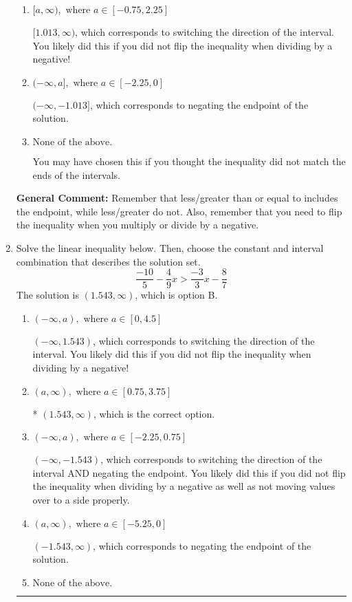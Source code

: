 \documentclass{extbook}[14pt]
\newcommand{\litem}[1]{\item #1

\rule{\textwidth}{0.4pt}}
\begin{document}
\begin{enumerate}
{\begin{enumerate}[label=\Alph*.]
* $(-\infty, 1.013]$, which is the correct option.
\item \( [a, \infty), \text{ where } a \in [-0.75, 2.25] \)

 $[1.013, \infty)$, which corresponds to switching the direction of the interval. You likely did this if you did not flip the inequality when dividing by a negative!
\item \( (-\infty, a], \text{ where } a \in [-2.25, 0] \)

 $(-\infty, -1.013]$, which corresponds to negating the endpoint of the solution.
\item \( \text{None of the above}. \)

You may have chosen this if you thought the inequality did not match the ends of the intervals.
\end{enumerate}

\textbf{General Comment:} Remember that less/greater than or equal to includes the endpoint, while less/greater do not. Also, remember that you need to flip the inequality when you multiply or divide by a negative.
}
\litem{
Solve the linear inequality below. Then, choose the constant and interval combination that describes the solution set.
\[ \frac{-10}{5} - \frac{4}{9} x > \frac{-3}{3} x - \frac{8}{7} \]The solution is \( (1.543, \infty) \), which is option B.\begin{enumerate}[label=\Alph*.]
\item \( (-\infty, a), \text{ where } a \in [0, 4.5] \)

 $(-\infty, 1.543)$, which corresponds to switching the direction of the interval. You likely did this if you did not flip the inequality when dividing by a negative!
\item \( (a, \infty), \text{ where } a \in [0.75, 3.75] \)

* $(1.543, \infty)$, which is the correct option.
\item \( (-\infty, a), \text{ where } a \in [-2.25, 0.75] \)

 $(-\infty, -1.543)$, which corresponds to switching the direction of the interval AND negating the endpoint. You likely did this if you did not flip the inequality when dividing by a negative as well as not moving values over to a side properly.
\item \( (a, \infty), \text{ where } a \in [-5.25, 0] \)

 $(-1.543, \infty)$, which corresponds to negating the endpoint of the solution.
\item \( \text{None of the above}. \)


\end{enumerate}}
\end{enumerate}
\end{document}
